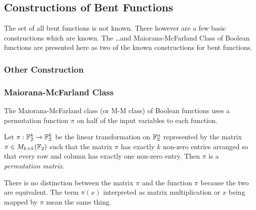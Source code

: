 
\subsection{Constructions of Bent Functions}\label{subsec:bent-constructions}
\par The set of all bent functions is not known. There however are a few basic
constructions which are known. The \dots and Maiorana-McFarland Class of Boolean
functions are presented here as two of the known constructions for bent
functions.
\subsubsection{Other Construction}
\subsubsection{Maiorana-McFarland Class}
\par The Maiorana-McFarland class (or M-M class) of Boolean functions uses a
permutation function $\pi$ on half of the input variables to each function.

\begin{definition}
  Let $\pi:\mathbb{F}_2^k\rightarrow\mathbb{F}_2^k$ be the linear transformation on
  $\mathbb{F}_2^n$ represented by the matrix $\pi\in M_{k\times k}(\mathbb{F}_2)$ such that the
  matrix $\pi$ has exactly $k$ non-zero entries arranged so that every row
  and column has exactly one non-zero entry. Then $\pi$ is a
  {\it permutation matrix}.
\end{definition}

\par There is no distinction between the matrix $\pi$ and the function $\pi$
because the two are equivalent. The term $\pi(x)$ interpreted as matrix
multiplication or $x$ being mapped by $\pi$ mean the same thing.

